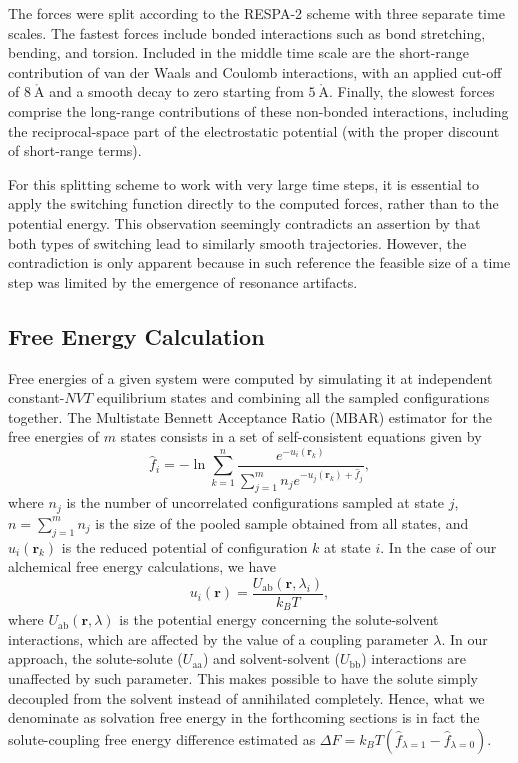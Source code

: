 \documentclass[
aip,
jcp,
reprint,
]{revtex4-1}
\newcommand{\vt}[1]{\boldsymbol{\mathbf{#1}}}          %
\renewcommand{\AA}{\mathring{A}}                       %
\begin{document}
The forces were split according to the RESPA-2 scheme \cite{Zhou_2001, Morrone_2010, Leimkuhler_2013} with three separate time scales.
The fastest forces include bonded interactions such as bond stretching, bending, and torsion.
Included in the middle time scale are the short-range contribution of van der Waals and Coulomb interactions, with an applied cut-off of $8~\mathrm{\AA}$ and a smooth decay to zero starting from $5~\mathrm{\AA}$.
Finally, the slowest forces comprise the long-range contributions of these non-bonded interactions, including the reciprocal-space part of the electrostatic potential (with the proper discount of short-range terms).

For this splitting scheme to work with very large time steps, it is essential to apply the switching function directly to the computed forces, rather than to the potential energy.
This observation seemingly contradicts an assertion by \citeauthor{Morrone_2010} \cite{Morrone_2010} that both types of switching lead to similarly smooth trajectories.
However, the contradiction is only apparent because in such reference the feasible size of a time step was limited by the emergence of resonance artifacts.

\subsection{Free Energy Calculation}
\label{sec:free energy calculation}

Free energies of a given system were computed by simulating it at independent constant-$NVT$ equilibrium states and combining all the sampled configurations together.
The Multistate Bennett Acceptance Ratio (MBAR) estimator \cite{Kong_2003, Shirts_2008} for the free energies of $m$ states consists in a set of self-consistent equations given by
\begin{equation}
\label{eq:mbar free energy estimator}
\hat f_i = -\ln \sum_{k=1}^n \frac{e^{-u_i(\vt r_k)}}{\sum_{j=1}^m n_j e^{-u_j(\vt r_k) + \hat f_j}},
\end{equation}
where $n_j$ is the number of uncorrelated configurations sampled at state $j$, $n = \sum_{j=1}^m n_j$ is the size of the pooled sample obtained from all states, and $u_i(\vt r_k)$ is the reduced potential of configuration $k$ at state $i$.
In the case of our alchemical free energy calculations, we have
\begin{equation}
u_i(\vt r) = \frac{U_\mathrm{ab}(\vt r, \lambda_i)}{k_B T},
\end{equation}
where $U_\mathrm{ab}(\vt r, \lambda)$ is the potential energy concerning the solute-solvent interactions, which are affected by the value of a coupling parameter $\lambda$.
In our approach, the solute-solute ($U_\mathrm{aa}$) and solvent-solvent ($U_\mathrm{bb}$) interactions are unaffected by such parameter.
This makes possible to have the solute simply decoupled from the solvent instead of annihilated completely.
Hence, what we denominate as solvation free energy in the forthcoming sections is in fact the solute-coupling free energy difference estimated as $\Delta F = k_B T ({\hat f}_{\lambda=1} - {\hat f}_{\lambda=0})$.
\end{document}
